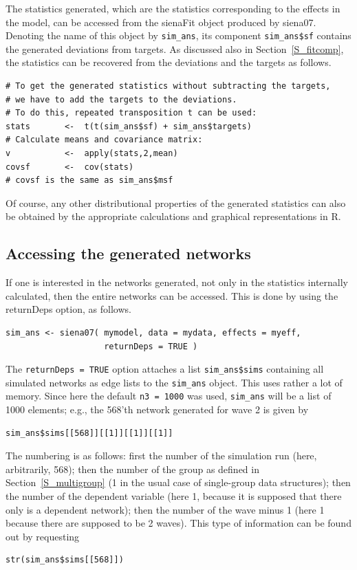 \documentclass[a4paper,fleqn,11pt]{article}
\newcommand{\+}{\, + \,}
\newcommand{\Rn}{{\sf R}}
\begin{document}
The statistics generated, which are the statistics
corresponding to the effects in the model,
can be accessed from the \textsf{sienaFit}
object produced by \textsf{siena07}.
Denoting the name of this object by \texttt{sim\_ans},
its component  \texttt{sim\_ans\$sf} contains the generated
deviations from targets. As discussed also in Section~\ref{S_fitcomp},
the statistics can be recovered from the deviations and the targets
as follows.
\begin{verbatim}
# To get the generated statistics without subtracting the targets,
# we have to add the targets to the deviations.
# To do this, repeated transposition t can be used:
stats       <-  t(t(sim_ans$sf) + sim_ans$targets)
# Calculate means and covariance matrix:
v           <-  apply(stats,2,mean)
covsf       <-  cov(stats)
# covsf is the same as sim_ans$msf
\end{verbatim}
Of course, any other distributional properties of the
generated statistics can also be obtained by the
appropriate calculations and graphical representations in \Rn.

\subsection{Accessing the generated networks}
\label{S_sims}

If one is interested in the networks generated, not only
in the statistics internally calculated,
then the entire networks can be accessed.
This is done by using the \textsf{returnDeps} option, as follows.
\begin{verbatim}
sim_ans <- siena07( mymodel, data = mydata, effects = myeff,
                    returnDeps = TRUE )
\end{verbatim}
The \texttt{returnDeps = TRUE} option attaches a list \texttt{sim\_ans\$sims}
containing all simulated networks
as edge lists to the \texttt{sim\_ans} object.
This uses rather a lot of memory.
Since here the default \texttt{n3 = 1000} was used, \texttt{sim\_ans} will be
a list of 1000 elements; e.g., the 568'th network generated
for wave 2 is given by
\begin{verbatim}
sim_ans$sims[[568]][[1]][[1]][[1]]
\end{verbatim}
The numbering is as follows: first the number of the simulation run (here,
arbitrarily, 568); then the number of the group as defined in
Section~\ref{S_multigroup} (1 in the usual case of single-group data structures);
then the number of the dependent variable (here 1, because it is supposed
that there only is a dependent network);
then the number of the wave minus 1 (here 1 because there are supposed to be
2 waves).
This type of information can be found out by requesting
\begin{verbatim}
str(sim_ans$sims[[568]])
\end{verbatim}
\end{document}
